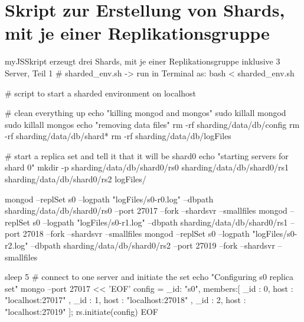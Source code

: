 \section{Skript zur Erstellung von Shards, mit je einer Replikationsgruppe}\label{shardSys}

\begin{listingsboxJavaScript}[label={lst:createShards}]{myJS}{Skript erzeugt drei Shards, mit je einer Replikationsgruppe inklusive 3 Server, Teil 1}
# sharded_env.sh -> run in Terminal as: bash < sharded_env.sh

# script to start a sharded environment on localhost

# clean everything up
echo "killing mongod and mongos"
sudo killall mongod
sudo killall mongos
echo "removing data files"
rm -rf sharding/data/db/config
rm -rf sharding/data/db/shard*
rm -rf sharding/data/db/logFiles

# start a replica set and tell it that it will be shard0
echo "starting servers for shard 0"
mkdir -p sharding/data/db/shard0/rs0 sharding/data/db/shard0/rs1 
sharding/data/db/shard0/rs2 logFiles/

mongod --replSet s0 --logpath "logFiles/s0-r0.log" 
--dbpath sharding/data/db/shard0/rs0 --port 27017 --fork --shardsvr --smallfiles
mongod --replSet s0 --logpath "logFiles/s0-r1.log" 
--dbpath sharding/data/db/shard0/rs1 --port 27018 --fork --shardsvr --smallfiles
mongod --replSet s0 --logpath "logFiles/s0-r2.log" 
--dbpath sharding/data/db/shard0/rs2 --port 27019 --fork --shardsvr --smallfiles

sleep 5
# connect to one server and initiate the set
echo "Configuring s0 replica set"
mongo --port 27017 << 'EOF'
config = { _id: "s0", members:[
          { _id : 0, host : "localhost:27017" },
          { _id : 1, host : "localhost:27018" },
          { _id : 2, host : "localhost:27019" }]};
rs.initiate(config)
EOF
\end{listingsboxJavaScript}

